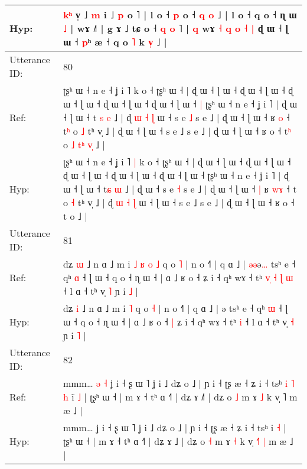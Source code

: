 \documentclass[10pt]{article}
\DeclareRobustCommand{\hl}[1]{{\textcolor{red}{#1}}}
\begin{document}
\begin{longtable}{ll}
 \\
Hyp: & \hl{k}\hl{ʰ} v\hl{}̩ ˩ \hl{m} i\hl{} ˩ \hl{p} o ˥ | l o ˧ \hl{p} o ˧ \hl{q} \hl{}\hl{o} ˩ | l o ˧ q o ˧ ɳ ɯ \hl{˩} | wɤ ˩˥ | g ɤ ˩ tɕ o ˧ \hl{q} \hl{}\hl{o} \hl{}˥ |\hl{ }\hl{q} wɤ \hl{}\hl{˧} \hl{q} \hl{o} \hl{˧} \hl{|} ɖ ɯ ˧ ɭ ɯ ˧ \hl{p}ʰ æ ˧ q o \hl{˥} k \hl{v}\hl{̩} ˩ |
 \\
\midrule
Utterance ID: & 80 \\
Ref: & ʈʂʰ ɯ ˧ n e ˧ ʝ i ˥\hl{}\hl{} k o ˧ ʈʂʰ ɯ ˧ | ɖ ɯ ˧ ɭ ɯ ˧ ɖ ɯ ˧ ɭ ɯ ˧ ɖ ɯ ˧ ɭ ɯ ˧ ɖ ɯ ˧ ɭ ɯ ˧ ɖ ɯ ˧ ɭ ɯ ˧\hl{ }\hl{|} ʈʂʰ ɯ ˧ n e ˧ ʝ i ˥ | ɖ ɯ ˧ ɭ ɯ ˧ t\hl{ }\hl{s} \hl{e} ˩ | ɖ\hl{ }\hl{ɯ}\hl{ }\hl{˧}\hl{ }\hl{ɭ} ɯ ˧ s e \hl{˩} s e ˩ | ɖ ɯ ˧ ɭ ɯ ˧\hl{}\hl{} ʁ \hl{}\hl{o} ˧ t\hl{ʰ} o \hl{˩} tʰ v̩ ˩ | ɖ\hl{}\hl{}\hl{}\hl{}\hl{}\hl{} ɯ ˧ ɭ ɯ ˧ s e ˩ s e ˩ | ɖ ɯ ˧ ɭ ɯ ˧ ʁ o ˧ t\hl{ʰ} o\hl{ }\hl{˩}\hl{ }\hl{t}\hl{ʰ}\hl{ }\hl{v}\hl{̩} ˩ |
 \\
Hyp: & ʈʂʰ ɯ ˧ n e ˧ ʝ i ˥\hl{ }\hl{|} k o ˧ ʈʂʰ ɯ ˧ | ɖ ɯ ˧ ɭ ɯ ˧ ɖ ɯ ˧ ɭ ɯ ˧ ɖ ɯ ˧ ɭ ɯ ˧ ɖ ɯ ˧ ɭ ɯ ˧ ɖ ɯ ˧ ɭ ɯ ˧\hl{}\hl{} ʈʂʰ ɯ ˧ n e ˧ ʝ i ˥ | ɖ ɯ ˧ ɭ ɯ ˧ t\hl{}\hl{ɕ} \hl{ɯ} ˩ | ɖ\hl{}\hl{}\hl{}\hl{}\hl{}\hl{} ɯ ˧ s e \hl{˧} s e ˩ | ɖ ɯ ˧ ɭ ɯ ˧\hl{ }\hl{|} ʁ \hl{w}\hl{ɤ} ˧ t\hl{} o \hl{˧} tʰ v̩ ˩ | ɖ\hl{ }\hl{ɯ}\hl{ }\hl{˧}\hl{ }\hl{ɭ} ɯ ˧ ɭ ɯ ˧ s e ˩ s e ˩ | ɖ ɯ ˧ ɭ ɯ ˧ ʁ o ˧ t\hl{} o\hl{}\hl{}\hl{}\hl{}\hl{}\hl{}\hl{}\hl{} ˩ |
 \\
\midrule
Utterance ID: & 81 \\
Ref: & dʑ \hl{ɯ} ˩ n ɑ ˩ m i\hl{ }\hl{˩}\hl{ }\hl{ʁ}\hl{ }\hl{o} \hl{˩} q o \hl{˥} | n o ˧˥ | q ɑ ˩ | \hl{ə}\hl{ə}ə\hl{…} tsʰ e ˧ qʰ \hl{ɑ} ˧ ɭ ɯ ˧ q o ˧ ɳ ɯ ˧ | ɑ ˩ ʁ o ˧\hl{}\hl{} ʑ i ˧ qʰ wɤ ˧ tʰ\hl{ }\hl{v}\hl{̩}\hl{ }\hl{˧}\hl{ }\hl{ɭ} \hl{ɯ} ˧ l ɑ ˧ tʰ v̩ \hl{˥} ɲ i \hl{˩} |
 \\
Hyp: & dʑ \hl{i} ˩ n ɑ ˩ m i\hl{}\hl{}\hl{}\hl{}\hl{}\hl{} \hl{˥} q o \hl{˧} | n o ˧˥ | q ɑ ˩ | \hl{}\hl{}ə\hl{} tsʰ e ˧ qʰ \hl{ɯ} ˧ ɭ ɯ ˧ q o ˧ ɳ ɯ ˧ | ɑ ˩ ʁ o ˧\hl{ }\hl{|} ʑ i ˧ qʰ wɤ ˧ tʰ\hl{}\hl{}\hl{}\hl{}\hl{}\hl{}\hl{} \hl{i} ˧ l ɑ ˧ tʰ v̩ \hl{˧} ɲ i \hl{˥} |
 \\
\midrule
Utterance ID: & 82 \\
Ref: & mmm…\hl{ }\hl{ə}\hl{ }\hl{˧} ʝ i ˧ ʂ ɯ ˥ ʝ i ˩ dʑ o ˩ | ɲ i ˧ ʈʂ æ ˧ ʑ i ˧ tsʰ\hl{ }\hl{i}\hl{ }\hl{˥}\hl{ }\hl{h} i\hl{̃} \hl{˩} | ʈʂʰ ɯ ˧ | m ɤ ˧ tʰ ɑ ˧˥ | dʑ ɤ ˩\hl{˥} | dʑ o \hl{˩} m ɤ \hl{˩} k v̩ \hl{}˥\hl{}\hl{} m æ ˩ |
 \\
Hyp: & mmm…\hl{}\hl{}\hl{}\hl{} ʝ i ˧ ʂ ɯ ˥ ʝ i ˩ dʑ o ˩ | ɲ i ˧ ʈʂ æ ˧ ʑ i ˧ tsʰ\hl{}\hl{}\hl{}\hl{}\hl{}\hl{} i\hl{} \hl{˧} | ʈʂʰ ɯ ˧ | m ɤ ˧ tʰ ɑ ˧˥ | dʑ ɤ ˩\hl{} | dʑ o \hl{˧} m ɤ \hl{˧} k v̩ \hl{˧}˥\hl{ }\hl{|} m æ ˩ |

\end{longtable}
\end{document}

